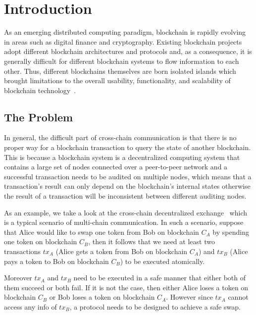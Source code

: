 \section{Introduction}
As an emerging distributed computing paradigm, blockchain is rapidly evolving in areas such as digital finance and cryptography. Existing blockchain projects adopt different blockchain architectures and protocols and, as a consequence, it is generally difficult for different blockchain systems to flow information to each other. Thus, different blockchains themselves are born isolated islands which brought limitations to the overall usability, functionality, and scalability of blockchain technology~\cite{anati2013innovative}.

\subsection{The Problem}
In general, the difficult part of cross-chain communication is that there is no proper way for a blockchain transaction to query the state of another blockchain. This is because a blockchain system is a decentralized computing system that contains a large set of nodes connected over a peer-to-peer network and a successful transaction needs to be audited on multiple nodes, which means that a transaction's result can only depend on the blockchain's internal states otherwise the result of a transaction will be inconsistent between different auditing nodes. 

As an example, we take a look at the cross-chain decentralized exchange~\cite{zetzsche2020decentralized} which is a typical scenario of multi-chain communication. In such a scenario, suppose that Alice would like to swap one token from Bob on blockchain $C_A$ by spending one token on blockchain $C_B$, then it follows that we need at least two transactions $tx_A$ (Alice gets a token from Bob on blockchain $C_A$) and $tx_B$ (Alice pays a token to Bob on blockchain $C_B$) to be executed atomically.

Moreover $tx_A$ and $tx_B$ need to be executed in a safe manner that either both of them succeed or both fail. If it is not the case, then either Alice loses a token on blockchain $C_B$ or Bob loses a token on blockchain $C_A$. However since $tx_A$ cannot access any info of $tx_B$, a protocol needs to be designed to achieve a safe swap.


